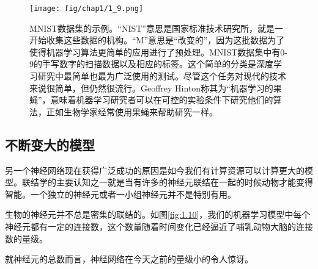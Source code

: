 \begin{figure}[htbp] %
   \centering
   \texttt{[image: fig/chap1/1\_9.png]} 
   \caption{MNIST数据集的示例。“NIST”意思是国家标准技术研究所，就是一开始收集这些数据的机构。“M”意思是“改变的”，因为这批数据为了使得机器学习算法更简单的应用进行了预处理。MNIST数据集中有0-9的手写数字的扫描数据以及相应的标签。这个简单的分类是深度学习研究中最简单也最为广泛使用的测试。尽管这个任务对现代的技术来说很简单，但仍然很流行。Geoffrey Hinton称其为“机器学习的果蝇”，意味着机器学习研究者可以在可控的实验条件下研究他们的算法，正如生物学家经常使用果蝇来帮助研究一样。}
   \label{fig:1.9}
 \end{figure}
   

\subsection{不断变大的模型}
\label{sec:1.2.3}
另一个神经网络现在获得广泛成功的原因是如今我们有计算资源可以计算更大的模型。联结学的主要认知之一就是当有许多的神经元联结在一起的时候动物才能变得智能。一个独立的神经元或者一小组神经元并不是特别有用。


生物的神经元并不总是密集的联结的。如图\ref{fig:1.10}，我们的机器学习模型中每个神经元都有一定的连接数，这个数量随着时间变化已经逼近了哺乳动物大脑的连接数的量级。


就神经元的总数而言，神经网络在今天之前的量级小的令人惊讶。


